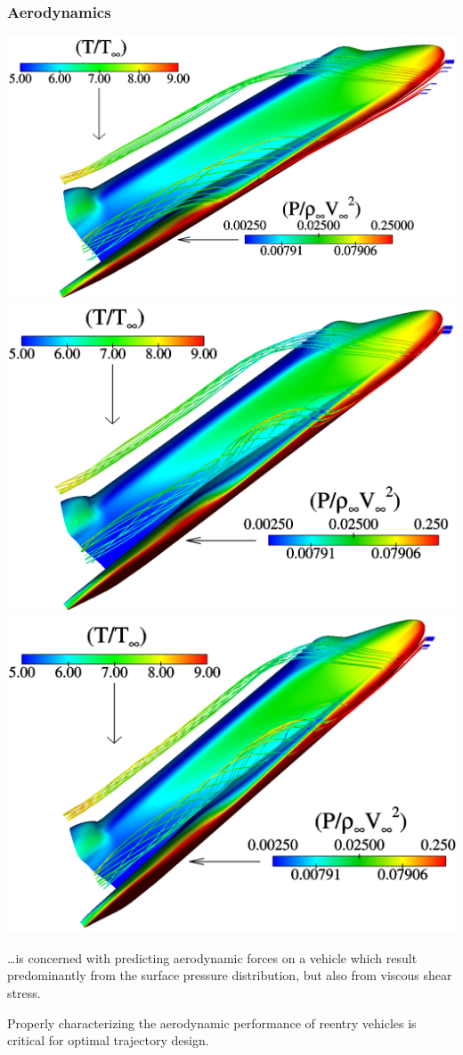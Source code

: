 \documentclass[compress,11pt]{beamer}
\begin{document}
\frame
{
  \frametitle{Aerodynamics}
  \includegraphics[width=.33\textwidth]{figures/orbiter/side_view_a30}
  \includegraphics[width=.33\textwidth]{figures/orbiter/side_view_a35}
  \includegraphics[width=.33\textwidth]{figures/orbiter/side_view_a40}

  \ldots is concerned with predicting aerodynamic forces on a vehicle which result predominantly from the surface pressure distribution, but also from viscous shear stress.
  \vspace{1em}

  Properly characterizing the aerodynamic performance of reentry vehicles is critical for optimal trajectory design.
}
 
\end{document}
